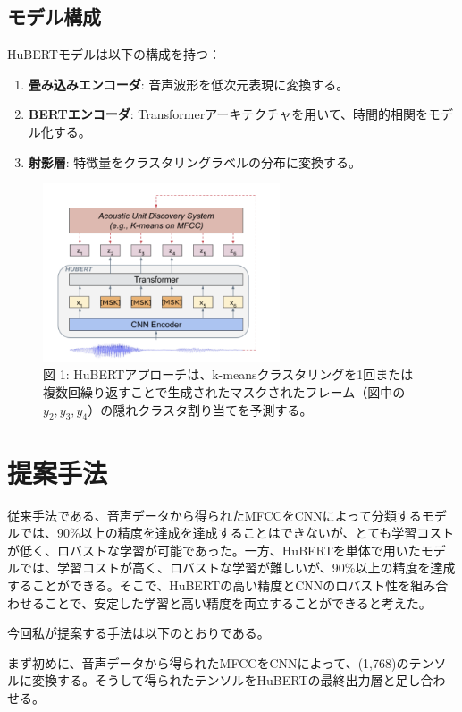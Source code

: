 \documentclass[10pt]{ltjsarticle}
\begin{document}
\subsection{モデル構成}
HuBERTモデルは以下の構成を持つ：
\begin{enumerate}
    \item \textbf{畳み込みエンコーダ}:
    音声波形を低次元表現に変換する。
    \item \textbf{BERTエンコーダ}:
    Transformerアーキテクチャを用いて、時間的相関をモデル化する。
    \item \textbf{射影層}:
    特徴量をクラスタリングラベルの分布に変換する。
\end{enumerate}

\begin{figure}
\centering
\includegraphics[width=70mm]{./img/HuBERT.png} 
\caption{{図 1}: HuBERTアプローチは、k-meansクラスタリングを1回または複数回繰り返すことで生成されたマスクされたフレーム（図中の \( y_2, y_3, y_4 \)）の隠れクラスタ割り当てを予測する。}
\end{figure}


\section{提案手法}

従来手法である、音声データから得られたMFCCをCNNによって分類するモデルでは、90\%以上の精度を達成を達成することはできないが、とても学習コストが低く、ロバストな学習が可能であった。一方、HuBERTを単体で用いたモデルでは、学習コストが高く、ロバストな学習が難しいが、90\%以上の精度を達成することができる。そこで、HuBERTの高い精度とCNNのロバスト性を組み合わせることで、安定した学習と高い精度を両立することができると考えた。

今回私が提案する手法は以下のとおりである。

まず初めに、音声データから得られたMFCCをCNNによって、(1,768)のテンソルに変換する。そうして得られたテンソルをHuBERTの最終出力層と足し合わせる。
\end{document}
